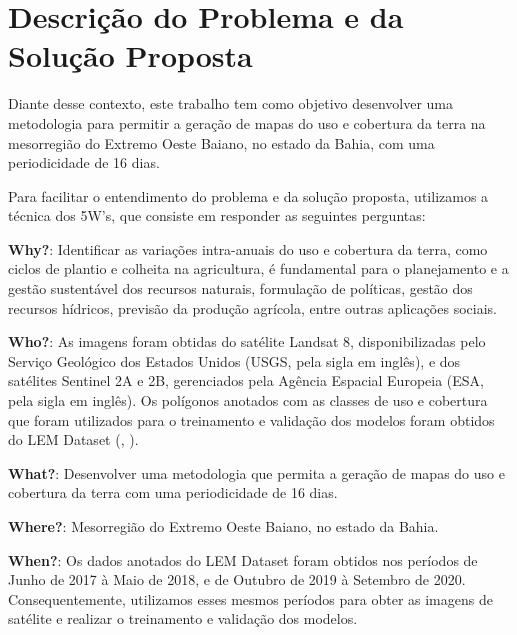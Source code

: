 \chapter{Descrição do Problema e da Solução Proposta}

Diante desse contexto, este trabalho tem como objetivo desenvolver uma metodologia para permitir a geração de mapas do uso e cobertura da terra na mesorregião do Extremo Oeste Baiano, no estado da Bahia, com uma periodicidade de 16 dias. 

Para facilitar o entendimento do problema e da solução proposta, utilizamos a técnica dos 5W's, que consiste em responder as seguintes perguntas:

\textbf{Why?}: Identificar as variações intra-anuais do uso e cobertura da terra, como ciclos de plantio e colheita na agricultura, é fundamental para o planejamento e a gestão sustentável dos recursos naturais, formulação de políticas, gestão dos recursos hídricos, previsão da produção agrícola, entre outras aplicações sociais.

\textbf{Who?}: As imagens foram obtidas do satélite Landsat 8, disponibilizadas pelo Serviço Geológico dos Estados Unidos (USGS, pela sigla em inglês), e dos satélites Sentinel 2A e 2B, gerenciados pela Agência Espacial Europeia (ESA, pela sigla em inglês). Os polígonos anotados com as classes de uso e cobertura que foram utilizados para o treinamento e validação dos modelos foram obtidos do LEM Dataset (, ). 

\textbf{What?}: Desenvolver uma metodologia que permita a geração de mapas do uso e cobertura da terra com uma periodicidade de 16 dias.

\textbf{Where?}: Mesorregião do Extremo Oeste Baiano, no estado da Bahia.  

\textbf{When?}: Os dados anotados do LEM Dataset foram obtidos nos períodos de Junho de 2017 à Maio de 2018, e de Outubro de 2019 à Setembro de 2020. Consequentemente, utilizamos esses mesmos períodos para obter as imagens de satélite e realizar o treinamento e validação dos modelos.  


\renewcommand{\cleardoublepage}{}
\renewcommand{\clearpage}{}
\vspace{5mm}

